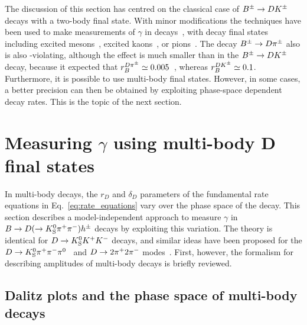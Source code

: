 The discussion of this section has centred on the classical case of ${{B}^\pm}\rightarrow D{{K}^\pm}$ decays with a two-body \D final state. With minor modifications the techniques have been used to make measurements of $\gamma$ in \Bz decays~\cite{altGammeToBeFilledIn}, with \B decay final states including excited \D mesons~\cite{altGammeToBeFilledIn}, excited kaons~\cite{altGammeToBeFilledIn}, or pions~\cite{altGammeToBeFilledIn}. The decay ${{B}^\pm}\rightarrow D {{\pi}^\pm}$ also is also \CP-violating, although the effect is much smaller than in the ${{B}^\pm}\rightarrow D{{K}^\pm}$ decay, because it expected that $r_B^{D\pi^\pm}\simeq 0.005$~\cite{kenzieEstimatingEnsuremathPi2016}, whereas $r_B^{{{D}{{K}^\pm}}}\simeq 0.1$. Furthermore, it is possible to use multi-body \D final states. However, in some cases, a better precision can then be obtained by exploiting phase-space dependent decay rates. This is the topic of the next section.



\section{\texorpdfstring{Measuring $\gamma$ using multi-body D final states}{Measuring gamma using multi-body D final states}} %
\label{sec:gamma_with_multibody_d_final_states}


In multi-body \D decays, the $r_D$ and $\delta_D$ parameters of the fundamental rate equations in Eq.~\eqref{eq:rate_equations} vary over the phase space of the \D decay. This section describes a model-independent approach to measure $\gamma$ in ${B}\rightarrow{\ensuremath{D}}(\rightarrow{\ensuremath{{K}^0_{\mathrm{S}}}}{\ensuremath{{\pi}^+}}{\ensuremath{{\pi}^-}})h^\pm$ decays by exploiting this variation. The theory is identical for ${D}\rightarrow{\ensuremath{{K}^0_{\mathrm{S}}}}{\ensuremath{{K}^+}}{\ensuremath{{K}^-}}$ decays, and similar ideas have been proposed for the ${D}\rightarrow{\ensuremath{{K}^0_{\mathrm{S}}}}{\ensuremath{{\pi}^+}}{\ensuremath{{\pi}^-}}{\ensuremath{{\pi}^0}}$~\cite{evansImprovedSensitivityCKM2020} and ${D}\rightarrow2{{\pi}^+}2{{\pi}^-}$ modes~\cite{harnewModelindependentDeterminationStrong2018}. First, however, the formalism for describing amplitudes of multi-body decays is briefly reviewed.


\subsection{Dalitz plots and the phase space of multi-body decays} %
\label{sub:the_phase_space_of_multibody_decays_and_dalitz_plots}

